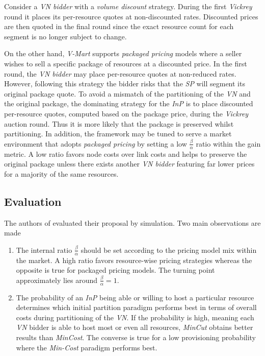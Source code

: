 \documentclass[prodmode,acmtomccap]{acmlarge}
\begin{document}
Consider a \emph{VN bidder} with a \emph{volume discount} strategy. During the first \emph{Vickrey} round it places its per-resource quotes at non-discounted rates.
Discounted prices are then quoted in the final round since the exact resource count for each segment is no longer subject to change.

On the other hand, \emph{V-Mart} supports \emph{packaged pricing} models where a seller wishes to sell a specific package of resources at a discounted price.
In the first round, the \emph{VN bidder} may place per-resource quotes at non-reduced rates. However, following this strategy the bidder risks that the \emph{SP}
will segment its original package quote. To avoid a mismatch of the partitioning of the \emph{VN} and the original package, the dominating strategy for the \emph{InP}
is to place discounted per-resource quotes, computed based on the package price, during the \emph{Vickrey} auction round. Thus it is more likely that the package is preserved
whilst partitioning. In addition, the framework may be tuned to serve a market environment that adopts \emph{packaged pricing} by
setting a low $\frac{\beta}{\alpha}$ ratio within the gain metric. A low ratio favors node costs over link costs and helps to preserve the original package unless there
exists another \emph{VN bidder} featuring far lower prices for a majority of the same resources.

\subsection{Evaluation}
The authors of  evaluated their proposal by simulation. Two main observations are made

\begin{enumerate}
	\item The internal ratio $\frac{\beta}{\alpha}$ should be set according to the pricing model mix within the market. A high ratio favors resource-wise
		pricing strategies whereas the opposite is true for packaged pricing models. The turning point approximately lies around $\frac{\beta}{\alpha} = 1$.
	\item The probability of an \emph{InP} being able or willing to host a particular resource determines which initial partition paradigm performs best in terms of overall costs 
		during partitioning of the \emph{VN}. If the probability is high, meaning each \emph{VN} bidder is able to host most or even all resources, \emph{MinCut} obtains
		better results than \emph{MinCost}. The converse is true for a low provisioning probability where the \emph{Min-Cost} paradigm performs best.
\end{enumerate}
\end{document}
